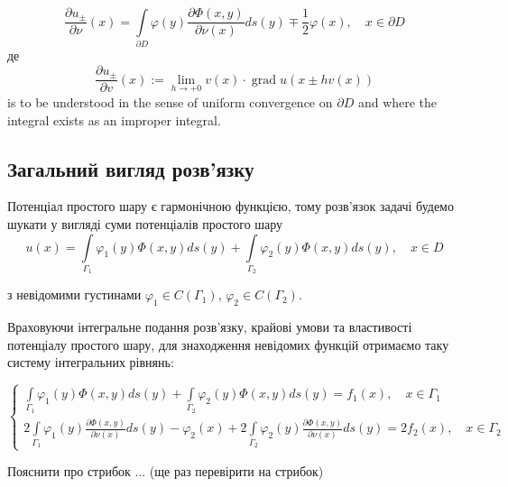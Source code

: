 \documentclass[14pt,a4paper]{extarticle}
\newcounter{e}
\numberwithin{equation}{section}
\newcommand{\intl}{\int\limits}
\begin{document}
 $$
 \frac{\partial u_{\pm}}{\partial \nu}(x) =
 \intl_{\partial D} \varphi(y) \frac{\partial \Phi(x, y)}{\partial \nu(x)} d s(y) \mp \frac{1}{2} \varphi(x),
 \quad x \in \partial D
 $$
 де
 $$
 \frac{\partial u_{\pm}}{\partial v}(x):=\lim _{h \rightarrow+0} v(x) \cdot \operatorname{grad} u(x \pm h v(x))
 $$
 is to be understood in the sense of uniform convergence on $\partial D$ and where the integral exists as an improper integral.
 
 \subsection{Загальний вигляд розв'язку}
 Потенціал простого шару є гармонічною функцією, тому розв'язок задачі \boundprob \space будемо шукати у вигляді суми потенціалів простого шару
 \begin{equation}
\label{potentials-sum-solution}
 u(x) 
 = \intl_{\Gamma_1} \varphi_1(y) \Phi(x, y) d s(y)
 + \intl_{\Gamma_2} \varphi_2(y) \Phi(x, y) d s(y)
 , \quad x \in D
 \end{equation}
 
 з невідомими густинами $\varphi_1 \in C(\Gamma_{1}) $, $\varphi_2 \in C(\Gamma_{2})$.
 
 Враховуючи інтегральне подання розв'язку, крайові умови та властивості потенціалу простого шару, для знаходження невідомих функцій отримаємо таку систему інтегральних рівнянь:
 
 \begin{equation}
 	\label{IE-system}
	 \left\{
	 \begin{array}{l}
	 	\displaystyle
	 	  \intl_{\Gamma_{1}} \varphi_1(y) \Phi(x, y) d s(y)
	 	+ \intl_{\Gamma_{2}} \varphi_2(y) \Phi(x, y) d s(y)
	 	= f_{1}(x), \quad x \in \Gamma_{1} 
	 	\\ [0.3cm]
	 	\displaystyle
	 	  2\intl_{\Gamma_{1}} \varphi_1(y) \frac{\partial \Phi(x, y)}{\partial \nu(x)} d s(y)
	 	- \varphi_2(x)
	 	+ 2\intl_{\Gamma_{2}} \varphi_2(y) \frac{\partial \Phi(x, y)}{\partial \nu(x)} d s(y)
	 	= 2f_{2}(x), \quad x \in \Gamma_{2}
 \end{array}\right.
 \end{equation}

 Пояснити про стрибок ...
 (ще раз перевірити на стрибок)
 

  
\end{document}
